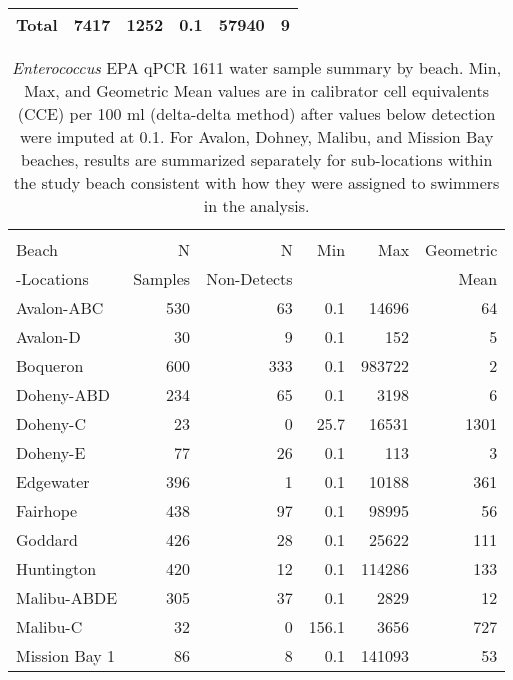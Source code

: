\documentclass[12pt]{article}\usepackage[]{graphicx}\usepackage[]{color}
\begin{document}
\begin{table}[h!tb]
\begin{center}
\begin{tabular}{l rrrrr}
\hline
 Total & 7417 & 1252 & 0.1 & 57940 & 9 \\ 
  
\hline
\end{tabular}
\end{center}
\end{table}


\begin{table}[h!tb]
\begin{center}
\caption{\textit{Enterococcus} EPA qPCR 1611 water sample summary by beach. Min, Max, and Geometric Mean values are in calibrator cell equivalents (CCE) per 100 ml (delta-delta method) after values below detection were imputed at 0.1. For Avalon, Dohney, Malibu, and Mission Bay beaches, results are summarized separately for sub-locations within the study beach consistent with how they were assigned to swimmers in the analysis. \label{tab:wq1611}}
\begin{tabular}{l rrrrr}
 & \\
Beach              & N       & N           & Min & Max & Geometric  \\
-Locations & Samples & Non-Detects &     &     & Mean \\
\hline
 Avalon-ABC & 530 & 63 & 0.1 & 14696 & 64 \\ 
  Avalon-D & 30 & 9 & 0.1 & 152 & 5 \\ 
  Boqueron & 600 & 333 & 0.1 & 983722 & 2 \\ 
  Doheny-ABD & 234 & 65 & 0.1 & 3198 & 6 \\ 
  Doheny-C & 23 & 0 & 25.7 & 16531 & 1301 \\ 
  Doheny-E & 77 & 26 & 0.1 & 113 & 3 \\ 
  Edgewater & 396 & 1 & 0.1 & 10188 & 361 \\ 
  Fairhope & 438 & 97 & 0.1 & 98995 & 56 \\ 
  Goddard & 426 & 28 & 0.1 & 25622 & 111 \\ 
  Huntington & 420 & 12 & 0.1 & 114286 & 133 \\ 
  Malibu-ABDE & 305 & 37 & 0.1 & 2829 & 12 \\ 
  Malibu-C & 32 & 0 & 156.1 & 3656 & 727 \\ 
  Mission Bay 1 & 86 & 8 & 0.1 & 141093 & 53 \\ 

\end{tabular}
\end{center}
\end{table}
\end{document}
